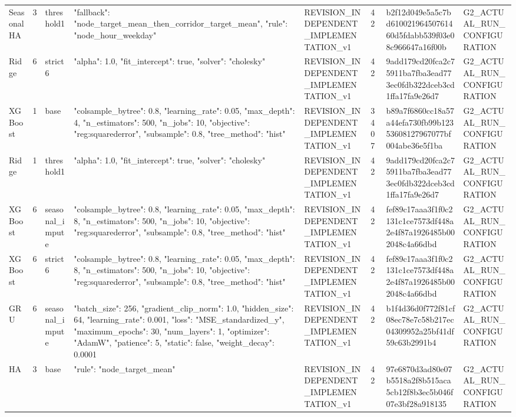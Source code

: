 \begin{longtable}{llllllll}
SeasonalHA & 3 & threshold1 & {"fallback": "node\_target\_mean\_then\_corridor\_target\_mean", "rule": "node\_hour\_weekday"} & REVISION\_INDEPENDENT\_IMPLEMENTATION\_v1 & 42 & b2f12d049e5a5c7bd61002196450761460d5fdabb539f03e08c966647a16f00b & G2\_ACTUAL\_RUN\_CONFIGURATION \\
Ridge & 6 & strict6 & {"alpha": 1.0, "fit\_intercept": true, "solver": "cholesky"} & REVISION\_INDEPENDENT\_IMPLEMENTATION\_v1 & 42 & 9add179cd20fca2c75911ba7fba3ead773ec0fdb322dceb3cd1ffa17fa9e26d7 & G2\_ACTUAL\_RUN\_CONFIGURATION \\
XGBoost & 1 & base & {"colsample\_bytree": 0.8, "learning\_rate": 0.05, "max\_depth": 4, "n\_estimators": 500, "n\_jobs": 10, "objective": "reg:squarederror", "subsample": 0.8, "tree\_method": "hist"} & REVISION\_INDEPENDENT\_IMPLEMENTATION\_v1 & 3407 & b89a7f6860cc18a57a44efa730fb99b12353608127967077bf004abe36e5f1ba & G2\_ACTUAL\_RUN\_CONFIGURATION \\
Ridge & 1 & threshold1 & {"alpha": 1.0, "fit\_intercept": true, "solver": "cholesky"} & REVISION\_INDEPENDENT\_IMPLEMENTATION\_v1 & 42 & 9add179cd20fca2c75911ba7fba3ead773ec0fdb322dceb3cd1ffa17fa9e26d7 & G2\_ACTUAL\_RUN\_CONFIGURATION \\
XGBoost & 6 & seasonal\_impute & {"colsample\_bytree": 0.8, "learning\_rate": 0.05, "max\_depth": 8, "n\_estimators": 500, "n\_jobs": 10, "objective": "reg:squarederror", "subsample": 0.8, "tree\_method": "hist"} & REVISION\_INDEPENDENT\_IMPLEMENTATION\_v1 & 42 & fef89c17aaa3f1f0c2131c1ce7573df448a2e4f87a1926485b002048c4a66dbd & G2\_ACTUAL\_RUN\_CONFIGURATION \\
XGBoost & 6 & strict6 & {"colsample\_bytree": 0.8, "learning\_rate": 0.05, "max\_depth": 8, "n\_estimators": 500, "n\_jobs": 10, "objective": "reg:squarederror", "subsample": 0.8, "tree\_method": "hist"} & REVISION\_INDEPENDENT\_IMPLEMENTATION\_v1 & 42 & fef89c17aaa3f1f0c2131c1ce7573df448a2e4f87a1926485b002048c4a66dbd & G2\_ACTUAL\_RUN\_CONFIGURATION \\
GRU & 6 & seasonal\_impute & {"batch\_size": 256, "gradient\_clip\_norm": 1.0, "hidden\_size": 64, "learning\_rate": 0.001, "loss": "MSE\_standardized\_y", "maximum\_epochs": 30, "num\_layers": 1, "optimizer": "AdamW", "patience": 5, "static": false, "weight\_decay": 0.0001} & REVISION\_INDEPENDENT\_IMPLEMENTATION\_v1 & 42 & b1f4d36d0f772f81cf08ec78e7c58b217ec04309952a25bf41df59c63b2991b4 & G2\_ACTUAL\_RUN\_CONFIGURATION \\
HA & 3 & base & {"rule": "node\_target\_mean"} & REVISION\_INDEPENDENT\_IMPLEMENTATION\_v1 & 42 & 97e6870d3ad80e07b5518a2f8b515aca5cb12f8b3ec5b046f07e3bf28a918135 & G2\_ACTUAL\_RUN\_CONFIGURATION \\

\end{longtable}
